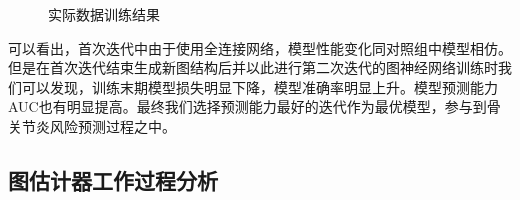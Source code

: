 \begin{figure}[ht]
\centering
{}
\caption{实际数据训练结果}
\label{fig:exp_train}
\end{figure}

可以看出，首次迭代中由于使用全连接网络，模型性能变化同对照组中模型相仿。但是在首次迭代结束生成新图结构后并以此进行第二次迭代的图神经网络训练时我们可以发现，训练末期模型损失明显下降，模型准确率明显上升。模型预测能力AUC也有明显提高。最终我们选择预测能力最好的迭代作为最优模型，参与到骨关节炎风险预测过程之中。

\subsection{图估计器工作过程分析}

